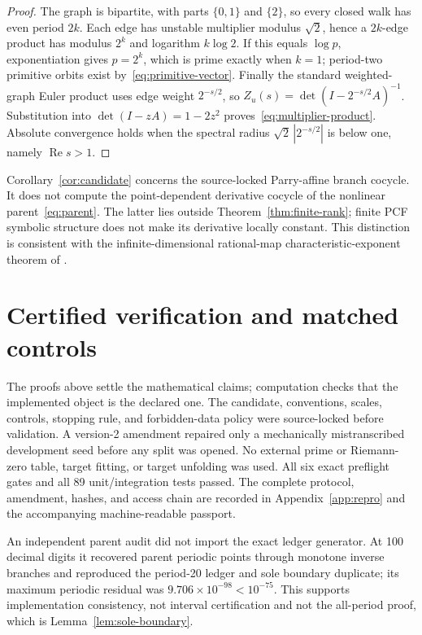 \documentclass[11pt]{article}
\theoremstyle{definition}
\theoremstyle{remark}
\begin{document}
\begin{proof}
The graph is bipartite, with parts \(\{0,1\}\) and \(\{2\}\), so every
closed walk has even period \(2k\).  Each edge has unstable multiplier
modulus \(\sqrt2\), hence a \(2k\)-edge product has modulus \(2^k\) and
logarithm \(k\log2\).  If this equals \(\log p\), exponentiation gives
\(p=2^k\), which is prime exactly when \(k=1\); period-two primitive orbits
exist by~\eqref{eq:primitive-vector}.  Finally the standard weighted-graph
Euler product uses edge weight \(2^{-s/2}\), so
\(Z_u(s)=\det(I-2^{-s/2}A)^{-1}\).  Substitution into
\(\det(I-zA)=1-2z^2\) proves~\eqref{eq:multiplier-product}.  Absolute
convergence holds when the spectral radius
\(\sqrt2\,|2^{-s/2}|\) is below one, namely \(\operatorname{Re}s>1\).
\end{proof}

Corollary~\ref{cor:candidate} concerns the source-locked Parry-affine branch
cocycle.  It does not compute the point-dependent derivative cocycle of the
nonlinear parent~\eqref{eq:parent}.  The latter lies outside
Theorem~\ref{thm:finite-rank}; finite PCF symbolic structure does not make its
derivative locally constant.  This distinction is consistent with the
infinite-dimensional rational-map characteristic-exponent theorem of
\citet{ji2026space}.

\section{Certified verification and matched controls}
\label{sec:audit}

The proofs above settle the mathematical claims; computation checks that the
implemented object is the declared one.  The candidate, conventions, scales,
controls, stopping rule, and forbidden-data policy were source-locked before
validation.  A version-2 amendment repaired only a mechanically mistranscribed
development seed before any split was opened.  No external prime or
Riemann-zero table, target fitting, or target unfolding was used.  All six
exact preflight gates and all 89 unit/integration tests passed.  The complete
protocol, amendment, hashes, and access chain are recorded in
Appendix~\ref{app:repro} and the accompanying machine-readable passport.

An independent parent audit did not import the exact ledger generator.  At
100 decimal digits it recovered parent periodic points through monotone inverse
branches and reproduced the period-20 ledger and sole boundary duplicate; its
maximum periodic residual was
\(9.706\times10^{-98}<10^{-75}\).  This supports implementation consistency,
not interval certification and not the all-period proof, which is
Lemma~\ref{lem:sole-boundary}.
\end{document}
